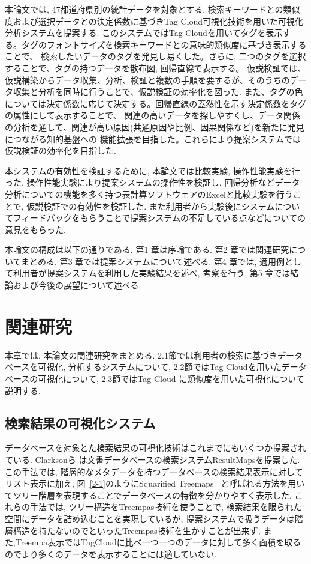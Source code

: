 \documentclass[sotsuron]{kuee}
\begin{document}
本論文では, 47都道府県別の統計データを対象とする,
検索キーワードとの類似度および選択データとの決定係数に基づきTag Cloud可視化技術を用いた可視化分析システムを提案する.
このシステムではTag Cloudを用いてタグを表示する。タグのフォントサイズを検索キーワードとの意味的類似度に基づき表示することで、
検索したいデータのタグを発見し易くした。さらに, 二つのタグを選択することで、タグの持つデータを散布図, 回帰直線で表示する。
仮説検証では、仮説構築からデータ収集、分析、検証と複数の手順を要するが、そのうちのデータ収集と分析を同時に行うことで、仮説検証の効率化を図った.
また、タグの色については決定係数に応じて決定する。回帰直線の蓋然性を示す決定係数をタグの属性にして表示することで、
関連の高いデータを探しやすくし、データ関係の分析を通して、関連が高い原因(共通原因や比例、因果関係など)を新たに発見につながる知的基盤への
機能拡張を目指した。これらにより提案システムでは仮説検証の効率化を目指した.

本システムの有効性を検証するために, 本論文では比較実験, 操作性能実験を行った.
操作性能実験により提案システムの操作性を検証し, 回帰分析などデータ分析についての機能を多く持つ表計算ソフトウェアのExcelと比較実験を行うことで,
仮説検証での有効性を検証した. また利用者から実験後にシステムについてフィードバックをもらうことで提案システムの不足している点などについての意見をもらった.

本論文の構成は以下の通りである. 第1 章は序論である. 第2 章では関連研究についてまとめる.
第3 章では提案システムについて述べる. 第4 章では, 適用例として利用者が提案システムを利用した実験結果を述べ, 考察を行う.
第5 章では結論および今後の展望について述べる.


\chapter{関連研究}

本章では, 本論文の関連研究をまとめる.
2.1節では利用者の検索に基づきデータベースを可視化, 分析するシステムについて, 2.2節ではTag Cloudを用いたデータベースの可視化について,
2.3節ではTag Cloud に類似度を用いた可視化について説明する.

\section{検索結果の可視化システム}

データベースを対象とた検索結果の可視化技術はこれまでにもいくつか提案されている.
Clarksonら
\cite{2.1-1}は文書データベースの検索システムResultMapsを提案した.
この手法では, 階層的なメタデータを持つデータベースの検索結果表示に対してリスト表示に加え, 図~\ref{2-1}のようにSquarified Treemaps
~\cite{2.1-2}と呼ばれる方法を用いてツリー階層を表現することでデータベースの特徴を分かりやすく表示した.
これらの手法では, ツリー構造をTreempas技術を使うことで, 検索結果を限られた空間にデータを詰め込むことを実現しているが,
提案システムで扱うデータは階層構造を持たないのでといったTreempas技術を生かすことが出来ず,
また,Treempa表示ではTagCloudに比べ一つ一つのデータに対して多く面積を取るのでより多くのデータを表示することには適していない.
\end{document}
